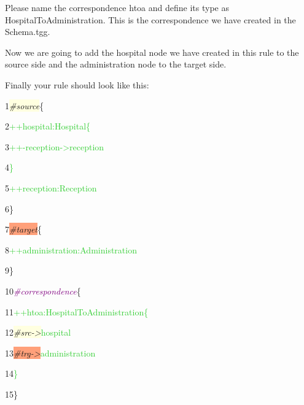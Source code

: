 \clearpage

Please name the correspondence \textsf{htoa} and define its type as \textsf{HospitalToAdministration}. This is the correspondence we have created in the Schema.tgg. 

Now we are going to add the hospital node we have created in this rule to the source side and the administration node to the target side.\newline

Finally your rule should look like this: \newline

{

1\hspace{0.5cm}\colorbox{LightYellow}{\textit{\#source}}\{ 

2\hspace{1cm}\textcolor{LimeGreen}{++hospital:Hospital\{}

3\hspace{1.5cm}\textcolor{LimeGreen}{++-reception->reception}

4\hspace{1cm}\textcolor{LimeGreen}{\}}

5\hspace{1cm}\textcolor{LimeGreen}{++reception:Reception}

6\hspace{0.5cm}\}

7\hspace{0.5cm}\colorbox{LightSalmon}{\textit{\#target}}\{

8\hspace{1cm}\textcolor{LimeGreen}{++administration:Administration}

9\hspace{0.5cm}\}

10\hspace{0.5cm}\textcolor{Purple}{\textit{\#correspondence}}\{

11\hspace{1cm}\textcolor{LimeGreen}{++htoa:HospitalToAdministration\{}

12\hspace{1.5cm}\colorbox{LightYellow}{\textit{\#src->}}\textcolor{LimeGreen}{hospital}

13\hspace{1.5cm}\colorbox{LightSalmon}{\textit{\#trg->}}\textcolor{LimeGreen}{administration}

14\hspace{1cm}\textcolor{LimeGreen}{\}}

15\hspace{0.5cm}\}\newline

}

